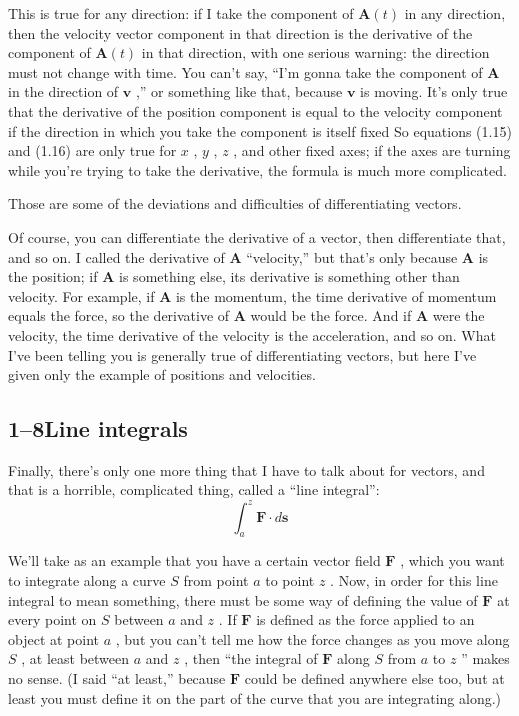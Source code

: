 \documentclass[11pt,oneside]{article}
\providecommand{\FLPA}{\mathbf{A}}
\providecommand{\FLPF}{\mathbf{F}}
\providecommand{\FLPs}{\mathbf{s}}
\providecommand{\FLPv}{\mathbf{v}}
\begin{document}
This is true for any direction: if I take the component of \(\FLPA(t)\) in any direction, then the velocity vector component in that direction is the derivative of the component of \(\FLPA(t)\) in that direction, with one serious warning: the direction must not change with time. You can't say, ``I'm gonna take the component of \(\FLPA\) in the direction of \(\FLPv\) ,'' or something like that, because \(\FLPv\) is moving. It's only true that the derivative of the position component is equal to the velocity component if the direction in which you take the component is itself fixed So equations (1.15) and (1.16) are only true for \(x\) , \(y\) , \(z\) , and other fixed axes; if the axes are turning while you're trying to take the derivative, the formula is much more complicated.\par

Those are some of the deviations and difficulties of differentiating vectors.\par

Of course, you can differentiate the derivative of a vector, then differentiate that, and so on. I called the derivative of \(\FLPA\) ``velocity,'' but that's only because \(\FLPA\) is the position; if \(\FLPA\) is something else, its derivative is something other than velocity. For example, if \(\FLPA\) is the momentum, the time derivative of momentum equals the force, so the derivative of \(\FLPA\) would be the force. And if \(\FLPA\) were the velocity, the time derivative of the velocity is the acceleration, and so on. What I've been telling you is generally true of differentiating vectors, but here I've given only the example of positions and velocities.\par

\subsection*{1--8Line integrals}

Finally, there's only one more thing that I have to talk about for vectors, and that is a horrible, complicated thing, called a ``line integral'': 
\begin{equation*} \tag{1.17}
\label{Eq:TIPS:1:17} \int_a^z \FLPF\cdot d\FLPs \end{equation*}
\par

We'll take as an example that you have a certain vector field \(\FLPF\) , which you want to integrate along a curve \(S\) from point \(a\) to point \(z\) . Now, in order for this line integral to mean something, there must be some way of defining the value of \(\FLPF\) at every point on \(S\) between \(a\) and \(z\) . If \(\FLPF\) is defined as the force applied to an object at point \(a\) , but you can't tell me how the force changes as you move along \(S\) , at least between \(a\) and \(z\) , then ``the integral of \(\FLPF\) along \(S\) from \(a\) to \(z\) '' makes no sense. (I said ``at least,'' because \(\FLPF\) could be defined anywhere else too, but at least you must define it on the part of the curve that you are integrating along.)\par
\end{document}
